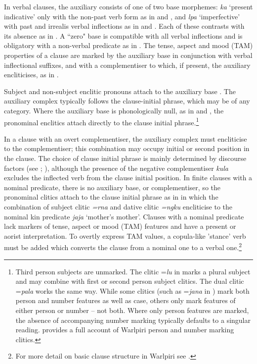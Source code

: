 \documentclass[output=paper]{../langscibook}
\begin{document}
In verbal clauses, the auxiliary consists of one of two base morphemes: \textit{ka} `present indicative' only with the non-past verb form as in  and , and \textit{lpa} `imperfective' with past and irrealis verbal inflections as in  and . Each of these contrasts with its absence as in . A ``zero" base is compatible with all verbal inflections and is obligatory with a non-verbal predicate as in . The tense, aspect and mood (TAM) properties of a clause are marked by the auxiliary base in conjunction with verbal inflectional suffixes, and with a complementiser to which, if present, the auxiliary encliticises, as in .

Subject and non-subject enclitic pronouns attach to the auxiliary base \citep{Hale1973}. The auxiliary complex typically follows the clause-initial phrase, which may be of any category. Where the auxiliary base is phonologically null, as in  and , the pronominal enclitics attach directly to the clause initial phrase.\footnote{Third person subjects are unmarked. The clitic =\textit{lu} in  marks a plural subject and may combine with first or second person subject clitics. The dual clitic =\textit{pala} works the same way. While some clitics (such as =\textit{jana} in ) mark both person and number features as well as case, others only mark features of either person or number – not both. Where only person features are marked, the absence of accompanying number marking typically defaults to a singular reading. \citet{Hale1973} provides a full account of Warlpiri person and number marking clitics.}

In a clause with an overt complementiser, the auxiliary complex must encliticise to the complementiser; this combination may occupy initial or second position in the clause. The choice of clause initial phrase is mainly determined by discourse factors (see \citealt{MushinSimpson2008}; \citealt{Swartz1991}), although the presence of the negative complementiser \textit{kula} excludes the inflected verb from the clause initial position. In finite clauses with a nominal predicate, there is no auxiliary base, or complementiser, so the pronominal clitics attach to the clause initial phrase as in  in which the combination of subject clitic \textit{=rna} and dative clitic \textit{=ngku} encliticise to the nominal kin predicate \textit{jaja} `mother's mother'. Clauses with a nominal predicate lack markers of tense, aspect or mood (TAM) features and have a present or aorist interpretation. To overtly express TAM values, a copula-like 'stance' verb must be added which converts the clause from a nominal one to a verbal one.\footnote{\textrm{For more detail on basic clause structure in Warlpiri see \citet{Hale1982}.}}
\end{document}
